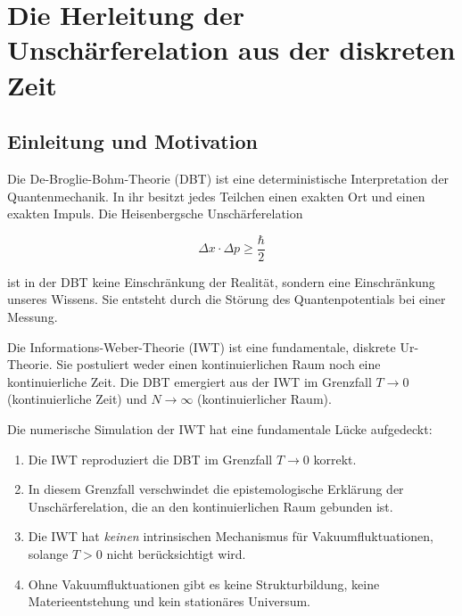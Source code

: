 
\chapter{Die Herleitung der Unschärferelation aus der diskreten Zeit}
\label{app:unschaerfe_herleitung}

\section{Einleitung und Motivation}
\label{app:unschaerfe_einleitung}

Die De-Broglie-Bohm-Theorie (DBT) ist eine deterministische Interpretation der Quantenmechanik. In ihr besitzt jedes Teilchen einen exakten Ort und einen exakten Impuls. Die Heisenbergsche Unschärferelation

\[
\Delta x \cdot \Delta p \ge \frac{\hbar}{2}
\]

ist in der DBT keine Einschränkung der Realität, sondern eine Einschränkung unseres Wissens. Sie entsteht durch die Störung des Quantenpotentials bei einer Messung.

Die Informations-Weber-Theorie (IWT) ist eine fundamentale, diskrete Ur-Theorie. Sie postuliert weder einen kontinuierlichen Raum noch eine kontinuierliche Zeit. Die DBT emergiert aus der IWT im Grenzfall $T \to 0$ (kontinuierliche Zeit) und $N \to \infty$ (kontinuierlicher Raum).

Die numerische Simulation der IWT hat eine fundamentale Lücke aufgedeckt:

\begin{enumerate}
    \item Die IWT reproduziert die DBT im Grenzfall $T \to 0$ korrekt.
    \item In diesem Grenzfall verschwindet die epistemologische Erklärung der Unschärferelation, die an den kontinuierlichen Raum gebunden ist.
    \item Die IWT hat \emph{keinen} intrinsischen Mechanismus für Vakuumfluktuationen, solange $T > 0$ nicht berücksichtigt wird.
    \item Ohne Vakuumfluktuationen gibt es keine Strukturbildung, keine Materieentstehung und kein stationäres Universum.
\end{enumerate}

